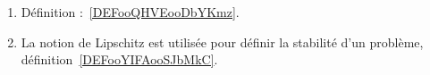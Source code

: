 
\begin{enumerate}
	\item
	      Définition :~\ref{DEFooQHVEooDbYKmz}.
	\item
	      La notion de Lipschitz est utilisée pour définir la stabilité d'un problème, définition~\ref{DEFooYIFAooSJbMkC}.
\end{enumerate}

